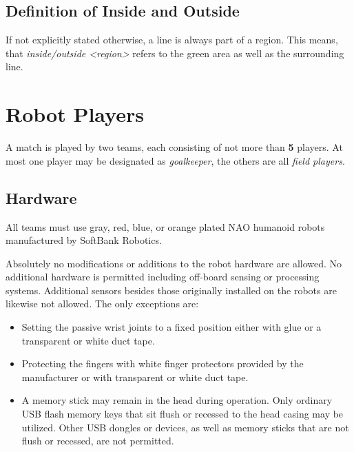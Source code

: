 \documentclass[12pt]{article}
\begin{document}
\subsection{Definition of Inside and Outside}
\label{sec:inside_outside}

If not explicitly stated otherwise, a line is always part of a region.
This means, that \emph{inside/outside \textless region\textgreater} refers to the green area as well as the surrounding line.

\newpage


\section{Robot Players}
\label{sec:robot_players}
A match is played by two teams, each consisting of not more than \textbf{5} players. At most one player may be designated as \emph{goalkeeper}, the others are all \emph{field players}.

\subsection{Hardware}
\label{sec:hardware}
All teams must use gray, red, blue, or orange plated NAO humanoid robots manufactured by SoftBank Robotics. 

Absolutely no modifications or additions to the robot hardware are allowed. No additional hardware is permitted including off-board sensing or processing systems. Additional sensors besides those originally installed on the robots are likewise not allowed. The only exceptions are:

\begin{itemize}

\item Setting the passive wrist joints to a fixed position either with glue or a transparent or white duct tape.

\item Protecting the fingers with white finger protectors provided by the manufacturer or with transparent or white duct tape.

\item A memory stick may remain in the head during operation.  Only ordinary USB flash memory keys that sit flush or recessed to the head casing may be utilized. Other USB dongles or devices, as well as memory sticks that are not flush or recessed, are not permitted.

\end{itemize}
\end{document}

